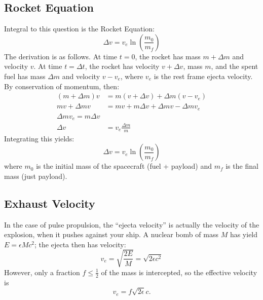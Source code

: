\documentclass[a4paper]{article}
\begin{document}
    \subsection{Rocket Equation}
    Integral to this question is the Rocket Equation:
    \begin{equation}
      \Delta v = v_{e}\ln\left(\frac{m_{0}}{m_{f}}\right)
    \end{equation}
    The derivation is as follows.  At time $t=0$, the rocket has mass $m+\Delta m$ and velocity $v$.  At time $t=\Delta t$, the rocket has velocity $v+\Delta v$, mass $m$, and the spent fuel has mass $\Delta m$ and velocity $v-v_{e}$, where $v_{e}$ is the rest frame ejecta velocity.  By conservation of momentum, then:
    \begin{align}
      (m+\Delta m)v &= m(v+\Delta v) + \Delta m (v-v_{e})\\
      mv + \Delta m v &= mv + m\Delta v + \Delta m v - \Delta mv_{e}\\
      \Delta m v_{e} = m\Delta v\\
      \Delta v &= v_{e}\frac{\Delta m}{m}
    \end{align}
    Integrating this yields:
    \begin{equation}
     \Delta v = v_{e}\ln\left(\frac{m_{0}}{m_{f}}\right)
    \end{equation}
    where $m_0$ is the initial mass of the spacecraft (fuel + payload) and $m_f$ is the final mass (just payload).
    
    \subsection{Exhaust Velocity}
      In the case of pulse propulsion, the ``ejecta velocity'' is actually the velocity of the explosion, when it pushes against your ship.  A nuclear bomb of mass $M$ has yield $E = \epsilon Mc^{2}$; the ejecta then has velocity:
      \begin{equation}
        v_{e} = \sqrt{\frac{2E}{M}} = \sqrt{2\epsilon c^{2}}
      \end{equation}
      However, only a fraction $f\leq \frac{1}{2}$ of the mass is intercepted, so the effective velocity is
      \begin{equation}
       v_{e} = f\sqrt{2\epsilon} c.
      \end{equation}
    
\end{document}

